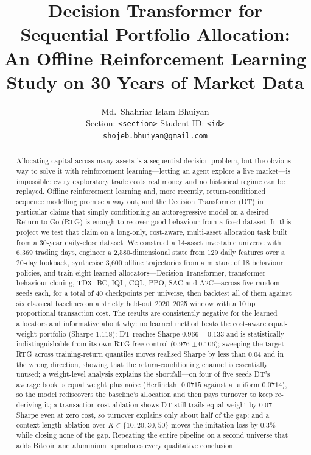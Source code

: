 \documentclass[11pt]{article}
\title{Decision Transformer for Sequential Portfolio Allocation:\\
An Offline Reinforcement Learning Study on 30 Years of Market Data}
\author{Md.\ Shahriar Islam Bhuiyan\\
Section: \texttt{<section>} \qquad Student ID: \texttt{<id>}\\
\texttt{shojeb.bhuiyan@gmail.com}}
\date{}
\begin{document}
\maketitle

\begin{abstract}
Allocating capital across many assets is a sequential decision problem, but the obvious way
to solve it with reinforcement learning---letting an agent explore a live market---is
impossible: every exploratory trade costs real money and no historical regime can be replayed.
Offline reinforcement learning and, more recently, return-conditioned sequence modelling
promise a way out, and the Decision Transformer (DT) in particular claims that simply
conditioning an autoregressive model on a desired Return-to-Go (RTG) is enough to recover
good behaviour from a fixed dataset. In this project we test that claim on a long-only,
cost-aware, multi-asset allocation task built from a 30-year daily-close dataset. We
construct a 14-asset investable universe with 6{,}369 trading days, engineer a 2{,}580-dimensional
state from 129 daily features over a 20-day lookback, synthesise 3{,}600 offline trajectories
from a mixture of 18 behaviour policies, and train eight learned allocators---Decision
Transformer, transformer behaviour cloning, TD3+BC, IQL, CQL, PPO, SAC and A2C---across five
random seeds each, for a total of 40 checkpoints per universe, then backtest all of them
against six classical baselines on a strictly held-out 2020--2025 window with a 10\,bp
proportional transaction cost. The results are consistently negative for the learned
allocators and informative about why: no learned method beats the cost-aware equal-weight
portfolio (Sharpe $1.118$); DT reaches Sharpe $0.966\pm0.133$ and is statistically
indistinguishable from its own RTG-free control ($0.976\pm0.106$); sweeping the target RTG
across training-return quantiles moves realised Sharpe by less than $0.04$ and in the wrong
direction, showing that the return-conditioning channel is essentially unused; a weight-level
analysis explains the shortfall---on four of five seeds DT's average book is equal weight plus
noise (Herfindahl $0.0715$ against a uniform $0.0714$), so the model rediscovers the baseline's
allocation and then pays turnover to keep re-deriving it; a
transaction-cost ablation shows DT still trails equal weight by $0.07$ Sharpe even at zero
cost, so turnover explains only about half of the gap; and a context-length ablation over
$K \in \{10,20,30,50\}$ moves the imitation loss by $0.3\%$ while closing none of the gap.
Repeating the entire
pipeline on a second universe that adds Bitcoin and aluminium reproduces every qualitative
conclusion.
\end{abstract}
\end{document}
